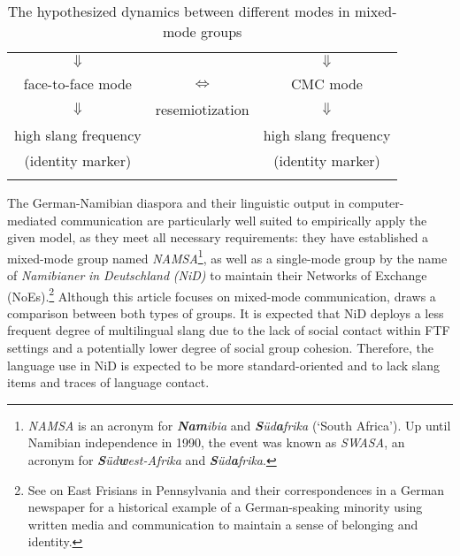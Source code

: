 \documentclass[output=paper]{langsci/langscibook}
\begin{document}
\begin{table}
\begin{tabular}{ccc}
\lsptoprule
\multicolumn{3}{c}{mixed-mode groups (in language contact settings)}\\
\midrule
${\Downarrow}$ & & ${\Downarrow}$ \\
face-to-face mode & ${\Leftrightarrow}$ & {CMC mode}\\
${\Downarrow}$ & resemiotization & ${\Downarrow}$ \\
 high slang frequency & & high slang frequency\\
(identity marker) & & (identity marker) \\
\lspbottomrule
\end{tabular}
\caption{The hypothesized dynamics between different modes in mixed-mode groups\label{tab:radke:1}}
\end{table}  


\begin{sloppypar}
The German-Namibian diaspora and their linguistic output in computer-me\-dia\-ted communication are particularly well suited to empirically apply the given model, as they meet all necessary requirements: they have established a mixed-mode group named \textit{NAMSA}\footnote{\textit{NAMSA} is an acronym for \textbf{\textit{Nam}}\textit{ibia} and \textbf{\textit{S}}\textit{üd}\textbf{\textit{a}}\textit{frika} (‘South Africa’). Up until Namibian independence in 1990, the event was known as \textit{SWASA}, an acronym for \textbf{\textit{S}}\textit{üd}\textbf{\textit{w}}\textit{est-Afrika} and \textbf{\textit{S}}\textit{üd}\textbf{\textit{a}}\textit{frika}.}, as well as a single-mode group by the name of \textit{Namibianer} \textit{in} \textit{Deutschland} \textit{(NiD)} to maintain their Networks of Exchange (NoEs).\footnote{See  on East Frisians in Pennsylvania and their correspondences in a German newspaper for a historical example of a German-speaking minority using written media and communication to maintain a sense of belonging and identity.} Although this article focuses on mixed-mode communication,  draws a comparison between both types of groups. It is expected that NiD deploys a less frequent degree of multilingual slang due to the lack of social contact within FTF settings and a potentially lower degree of social group cohesion. Therefore, the language use in NiD is expected to be more standard-oriented and to lack slang items and traces of language contact.
\end{sloppypar}
\end{document}
